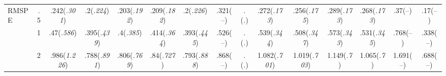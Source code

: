 \documentclass{article}
\begin{document}
\begin{table}[tbp]
{\begin{tabularx}{\textwidth}{lCCCCCCCCCCCCCC}
\midrule RMSPE&.5&.242\newline (\emph{.301})&.2\newline (\emph{.224})&.203\newline (\emph{.192})&.209\newline (\emph{.182})&.2\newline (\emph{.226})&.321\newline (--)&.\newline (\emph{.})&.272\newline (\emph{.173})&.256\newline (\emph{.175})&.289\newline (\emph{.173})&.268\newline (\emph{.173})&.37\newline (--)&.17\newline (--) \tabularnewline
&1&.47\newline (\emph{.586})&.395\newline (\emph{.439})&.4\newline (\emph{.385})&.414\newline (\emph{.364})&.393\newline (\emph{.445})&.526\newline (--)&.\newline (\emph{.})&.539\newline (\emph{.344})&.508\newline (\emph{.347})&.573\newline (\emph{.343})&.531\newline (\emph{.345})&.768\newline (--)&.338\newline (--) \tabularnewline
&2&.986\newline (\emph{1.226})&.788\newline (\emph{.891})&.806\newline (\emph{.769})&.84\newline (\emph{.727})&.793\newline (\emph{.888})&.868\newline (--)&.\newline (\emph{.})&1.082\newline (\emph{.701})&1.019\newline (\emph{.703})&1.149\newline (\emph{.7})&1.065\newline (\emph{.7})&1.691\newline (--)&.688\newline (--) \tabularnewline

\end{tabularx}}
\end{table}
\end{document}
